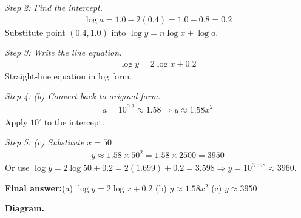 \documentclass[11pt]{article}
\begin{document}
\textit{Step 2: Find the intercept.}
\[\begin{gathered}
\log a = 1.0 - 2(0.4) = 1.0 - 0.8 = 0.2
\end{gathered}\]
Substitute point \( (0.4, 1.0) \) into \( \log y = n\log x + \log a \).

\textit{Step 3: Write the line equation.}
\[\begin{gathered}
\log y = 2\log x + 0.2
\end{gathered}\]
Straight-line equation in log form.

\textit{Step 4: (b) Convert back to original form.}
\[\begin{gathered}
a = 10^{0.2} \approx 1.58 \Rightarrow y \approx 1.58x^2
\end{gathered}\]
Apply \( 10^{\square} \) to the intercept.

\textit{Step 5: (c) Substitute \( x = 50 \).}
\[\begin{gathered}
y \approx 1.58 \times 50^2 = 1.58 \times 2500 = 3950
\end{gathered}\]
Or use \( \log y = 2\log 50 + 0.2 = 2(1.699) + 0.2 = 3.598 \Rightarrow y = 10^{3.598} \approx 3960 \).

\begin{answerbox}
\textbf{Final answer:}\quad (a) \(\displaystyle  \log y = 2\log x + 0.2 \) \quad  (b) \(\displaystyle  y \approx 1.58x^2 \) \quad  (c) \(\displaystyle  y \approx 3950 \)
\end{answerbox}
\textbf{Diagram.}
\end{document}
